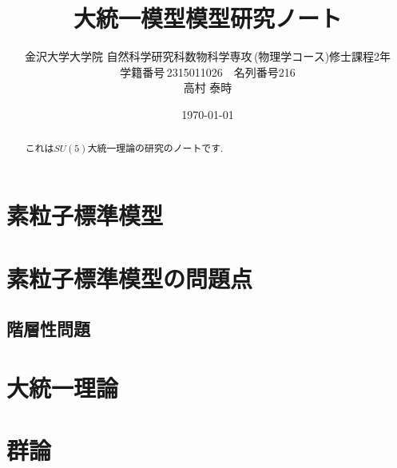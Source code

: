 \documentclass[titlepage]{jsbook}
\theoremstyle{plain}
\theoremstyle{definition}
\begin{document}
\title{大統一模型模型研究ノート}
\author{金沢大学大学院\,\,自然科学研究科数物科学専攻\,(物理学コース)修士課程2年\\学籍番号\,2315011026$\quad$名列番号216\\高村 泰時} 
\date{\today}
\maketitle

\tableofcontents
\clearpage

\begin{abstract}
  これは$SU(5)$大統一理論の研究のノートです.
\end{abstract}

\chapter{素粒子標準模型}


\chapter{素粒子標準模型の問題点}


\section{階層性問題}


\chapter{大統一理論}


\chapter{群論}





\end{document}
